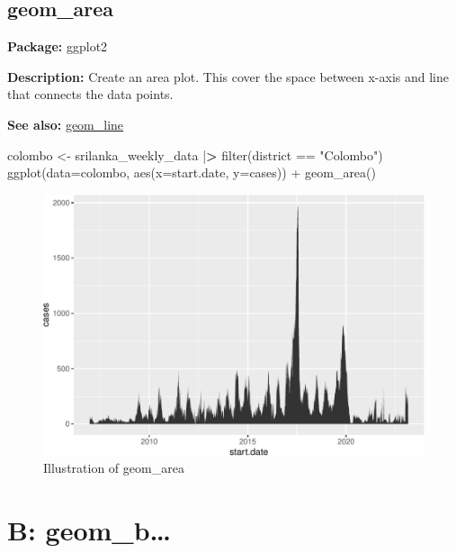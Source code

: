 \documentclass[
]{book}
\newenvironment{Shaded}{\begin{snugshade}}{\end{snugshade}}
\newcommand{\AttributeTok}[1]{\textcolor[rgb]{0.77,0.63,0.00}{#1}}
\newcommand{\ErrorTok}[1]{\textcolor[rgb]{0.64,0.00,0.00}{\textbf{#1}}}
\newcommand{\FunctionTok}[1]{\textcolor[rgb]{0.00,0.00,0.00}{#1}}
\newcommand{\NormalTok}[1]{#1}
\newcommand{\OtherTok}[1]{\textcolor[rgb]{0.56,0.35,0.01}{#1}}
\newcommand{\SpecialCharTok}[1]{\textcolor[rgb]{0.00,0.00,0.00}{#1}}
\newcommand{\StringTok}[1]{\textcolor[rgb]{0.31,0.60,0.02}{#1}}
\begin{document}
\hypertarget{area}{%
\section{geom\_area}\label{area}}

\textbf{Package: } ggplot2 \autocite{R-ggplot2}

\textbf{Description: }Create an area plot. This cover the space between x-axis and line that connects the data points.

\textbf{See also: } \protect\hyperlink{line}{geom\_line}

\begin{Shaded}
\begin{Highlighting}[]
\NormalTok{colombo }\OtherTok{\textless{}{-}}\NormalTok{ srilanka\_weekly\_data }\SpecialCharTok{|}\ErrorTok{\textgreater{}}
  \FunctionTok{filter}\NormalTok{(district }\SpecialCharTok{==} \StringTok{"Colombo"}\NormalTok{)}
\FunctionTok{ggplot}\NormalTok{(}\AttributeTok{data=}\NormalTok{colombo, }\FunctionTok{aes}\NormalTok{(}\AttributeTok{x=}\NormalTok{start.date, }\AttributeTok{y=}\NormalTok{cases)) }\SpecialCharTok{+} 
  \FunctionTok{geom\_area}\NormalTok{()}
\end{Highlighting}
\end{Shaded}

\begin{figure}
\centering
\includegraphics{Data-Visualisation-geom-Encyclopedia_files/figure-latex/unnamed-chunk-17-1.pdf}
\caption{\label{fig:unnamed-chunk-17}Illustration of geom\_area}
\end{figure}

\hypertarget{b-geom_b}{%
\chapter{B: geom\_b\ldots{}}\label{b-geom_b}}
\end{document}
